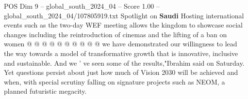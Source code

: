 \begin{textsample}{POS Dim 9 – global\_south\_2024\_04 – Score 1.00 – global\_south\_2024\_04/107805919.txt}
Spotlight on \textbf{Saudi} Hosting international events such as the two-day WEF meeting allows the kingdom to showcase social changes including the reintroduction of cinemas and the lifting of a ban on women @ @ @ @ @ @ @ @ @ @ we have demonstrated our willingness to lead the way towards a model of transformative growth that is innovative, inclusive and sustainable.
And we ' ve seen some of the results,"Ibrahim said on Saturday.
Yet questions persist about just how much of Vision 2030 will be achieved and when, with special scrutiny falling on signature projects such as NEOM, a planned futuristic megacity.

\end{textsample}
